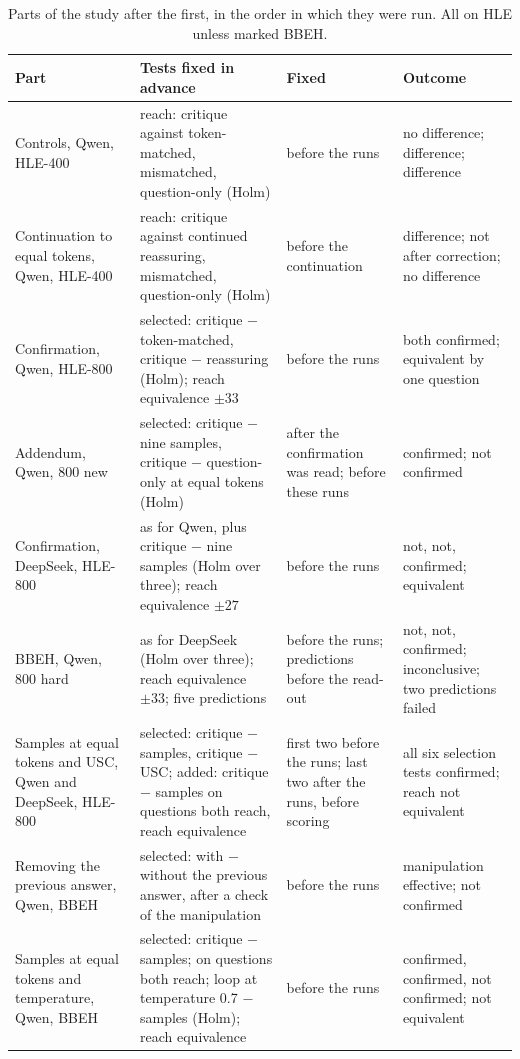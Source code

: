 \documentclass[11pt]{article}
\newcommand{\ds}{DeepSeek}
\newcommand{\qw}{Qwen}
\begin{document}
\begin{table}[t]
\centering
\small
\setlength{\tabcolsep}{3pt}
\begin{tabular}{@{}p{3.6cm} p{4.4cm} p{2.6cm} p{4.6cm}@{}}
\toprule
Part & Tests fixed in advance & Fixed & Outcome \\
\midrule
Controls, \qw, HLE-400 & reach: critique against token-matched, mismatched, question-only (Holm) & before the runs & no difference; difference; difference \\
Continuation to equal tokens, \qw, HLE-400 & reach: critique against continued reassuring, mismatched, question-only (Holm) & before the continuation & difference; not after correction; no difference \\
Confirmation, \qw, HLE-800 & selected: critique $-$ token-matched, critique $-$ reassuring (Holm); reach equivalence $\pm33$ & before the runs & both confirmed; equivalent by one question \\
Addendum, \qw, 800 new & selected: critique $-$ nine samples, critique $-$ question-only at equal tokens (Holm) & after the confirmation was read; before these runs & confirmed; not confirmed \\
Confirmation, \ds, HLE-800 & as for \qw, plus critique $-$ nine samples (Holm over three); reach equivalence $\pm27$ & before the runs & not, not, confirmed; equivalent \\
BBEH, \qw, 800 hard & as for \ds{} (Holm over three); reach equivalence $\pm33$; five predictions & before the runs; predictions before the read-out & not, not, confirmed; inconclusive; two predictions failed \\
Samples at equal tokens and USC, \qw{} and \ds, HLE-800 & selected: critique $-$ samples, critique $-$ USC; added: critique $-$ samples on questions both reach, reach equivalence & first two before the runs; last two after the runs, before scoring & all six selection tests confirmed; reach not equivalent \\
Removing the previous answer, \qw, BBEH & selected: with $-$ without the previous answer, after a check of the manipulation & before the runs & manipulation effective; not confirmed \\
Samples at equal tokens and temperature, \qw, BBEH & selected: critique $-$ samples; on questions both reach; loop at temperature 0.7 $-$ samples (Holm); reach equivalence & before the runs & confirmed, confirmed, not confirmed; not equivalent \\
\bottomrule
\end{tabular}
\caption{Parts of the study after the first, in the order in which they were run. All on HLE unless marked BBEH.}
\label{tab:order}
\end{table}
\end{document}
